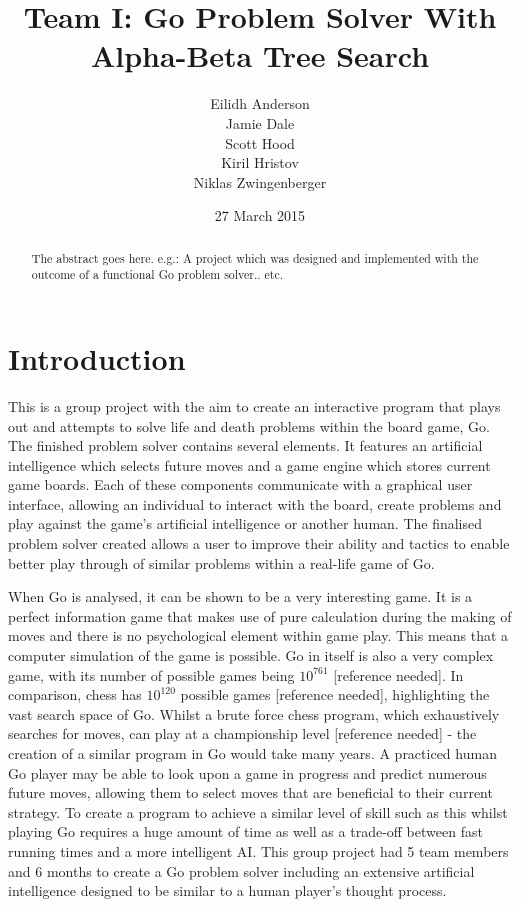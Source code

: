\documentclass{l3proj}
\begin{document}
\title{Team I: Go Problem Solver With Alpha-Beta Tree Search}
\author{Eilidh Anderson \\
        Jamie Dale \\
        Scott Hood \\
        Kiril Hristov \\
        Niklas Zwingenberger}
\date{27 March 2015}
\maketitle
\begin{abstract}

The abstract goes here.
e.g.: A project which was designed and implemented with the outcome of a functional Go problem solver.. etc.

\end{abstract}
\educationalconsent

\tableofcontents

\chapter{Introduction}
\label{intro}

This is a group project with the aim to create an interactive program that plays out and attempts to solve life and death problems within the board game, Go. The finished problem solver contains several elements. It features an artificial intelligence which selects future moves and a game engine which stores current game boards. Each of these components communicate with a graphical user interface, allowing an individual to interact with the board, create problems and play against the game's artificial intelligence or another human. The finalised problem solver created allows a user to improve their ability and tactics to enable better play through of similar problems within a real-life game of Go.

When Go is analysed, it can be shown to be a very interesting game. It is a perfect information game that makes use of pure calculation during the making of moves and there is no psychological element within game play. This means that a computer simulation of the game is possible. Go in itself is also a very complex game, with its number of possible games being $10^{761}$ [reference needed]. In comparison, chess has $10^{120}$ possible games [reference needed], highlighting the vast search space of Go. Whilst a brute force chess program, which exhaustively searches for moves, can play at a championship level [reference needed] - the creation of a similar program in Go would take many years. A practiced human Go player may be able to look upon a game in progress and predict numerous future moves, allowing them to select moves that are beneficial to their current strategy. To create a program to achieve a similar level of skill such as this whilst playing Go requires a huge amount of time as well as a trade-off between fast running times and a more intelligent AI. This group project had 5 team members and 6 months to create a Go problem solver including an extensive artificial intelligence designed to be similar to a human player's thought process.
\end{document}
